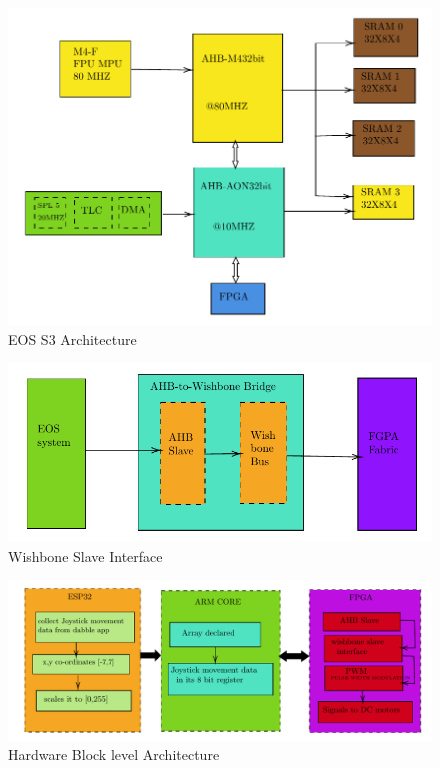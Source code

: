 \begin{enumerate}[label=\thesection.\arabic*.,ref=\thesection.\theenumi]
\begin{figure}[!ht]
\centering
\includegraphics[width=0.5\columnwidth]{figs/block3}
\centering
\caption{EOS S3 Architecture }
\end{figure}

\begin{figure}[!ht]
\centering
\includegraphics[width=0.5\columnwidth]{figs/block4}
\centering
\caption{Wishbone Slave Interface  }
\end{figure}
\begin{figure}[!ht]
\centering
\includegraphics[width=0.5\columnwidth]{figs/block5}
\centering
\caption{Hardware Block level Architecture }
\end{figure}

\end{enumerate}